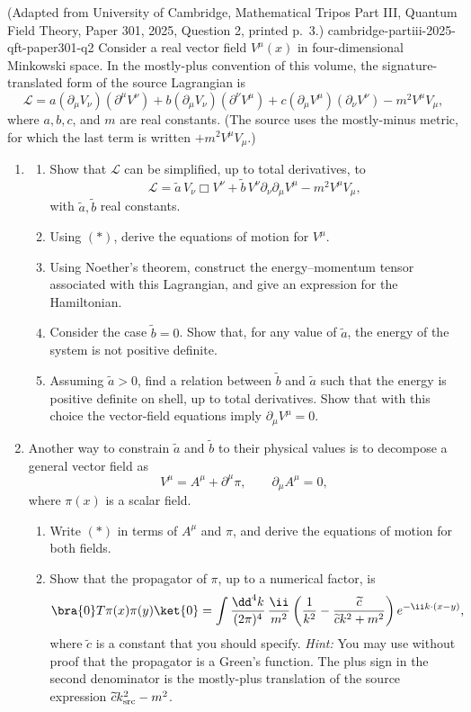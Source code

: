 \begin{enumerate}
  {(Adapted from University of Cambridge, Mathematical Tripos Part III, Quantum Field Theory, Paper 301, 2025, Question 2, printed p.~3.)}
  {cambridge-partiii-2025-qft-paper301-q2}
Consider a real vector field \(V^\mu(x)\) in four-dimensional
Minkowski space.  In the mostly-plus convention of this volume, the
signature-translated form of the source Lagrangian is
\[
 \mathcal L
 =a(\partial_\mu V_\nu)(\partial^\mu V^\nu)
 +b(\partial_\mu V_\nu)(\partial^\nu V^\mu)
 +c(\partial_\mu V^\mu)(\partial_\nu V^\nu)
 -m^2V^\mu V_\mu,
\]
where \(a,b,c\), and \(m\) are real constants.  (The source uses the
mostly-minus metric, for which the last term is written
\(+m^2V^\mu V_\mu\).)
\begin{enumerate}
\item
\begin{enumerate}
\renewcommand{\labelenumiii}{(\roman{enumiii})}
\item
Show that \(\mathcal L\) can be simplified, up to total derivatives,
to
\[
 \mathcal L
 =\widetilde a\,V_\nu\Box V^\nu
 +\widetilde b\,V^\nu\partial_\nu\partial_\mu V^\mu
 -m^2V^\mu V_\mu,                                      \tag{*}
\]
with \(\widetilde a,\widetilde b\) real constants.
\item
Using \((*)\), derive the equations of motion for \(V^\mu\).
\item
Using Noether's theorem, construct the energy--momentum tensor
associated with this Lagrangian, and give an expression for the
Hamiltonian.
\item
Consider the case \(\widetilde b=0\).  Show that, for any value of
\(\widetilde a\), the energy of the system is not positive definite.
\item
Assuming \(\widetilde a>0\), find a relation between
\(\widetilde b\) and \(\widetilde a\) such that the energy is positive
definite on shell, up to total derivatives.  Show that with this choice
the vector-field equations imply \(\partial_\mu V^\mu=0\).
\end{enumerate}
\item
Another way to constrain \(\widetilde a\) and \(\widetilde b\) to
their physical values is to decompose a general vector field as
\[
 V^\mu=A^\mu+\partial^\mu\pi,
 \qquad \partial_\mu A^\mu=0,
\]
where \(\pi(x)\) is a scalar field.
\begin{enumerate}
\renewcommand{\labelenumiii}{(\roman{enumiii})}
\item
Write \((*)\) in terms of \(A^\mu\) and \(\pi\), and derive the
equations of motion for both fields.
\item
Show that the propagator of \(\pi\), up to a numerical factor, is
\[
 \bra{0}T\pi(x)\pi(y)\ket{0}
 =\int\frac{\dd^4k}{(2\pi)^4}\,
 \frac{\ii}{m^2}
 \left(\frac{1}{k^2}
       -\frac{\widetilde c}{\widetilde c k^2+m^2}\right)
 e^{-\ii k\cdot(x-y)},
\]
where \(\widetilde c\) is a constant that you should specify.
\emph{Hint:} You may use without proof that the propagator is a
Green's function.  The plus sign in the second denominator is the
mostly-plus translation of the source expression
\(\widetilde c k_{\rm src}^2-m^2\).


\end{enumerate}
\end{enumerate}
\end{enumerate}
